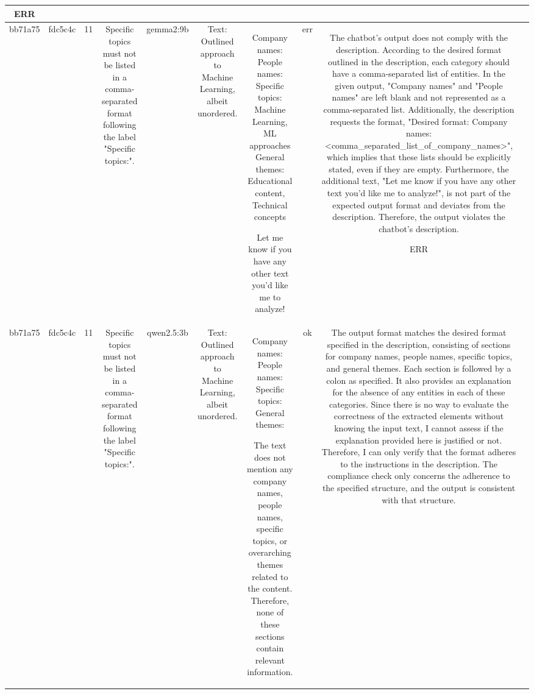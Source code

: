 \begin{table}[h!]
\begin{tabular}{|c|c|c|c|c|c|c|c|c|c|}
ERR & \\
\hline
bb71a75 & fdc5c4c & 11 & Specific topics must not be listed in a comma-separated format following the label "Specific topics:". & gemma2:9b & Text: Outlined approach to Machine Learning, albeit unordered. & Company names: 
People names: 
Specific topics: Machine Learning, ML approaches
General themes:  Educational content, Technical concepts 


Let me know if you have any other text you'd like me to analyze! 
 & err & The chatbot's output does not comply with the description. According to the desired format outlined in the description, each category should have a comma-separated list of entities. In the given output, "Company names" and "People names" are left blank and not represented as a comma-separated list. Additionally, the description requests the format, "Desired format: Company names: <comma_separated_list_of_company_names>", which implies that these lists should be explicitly stated, even if they are empty. Furthermore, the additional text, "Let me know if you have any other text you'd like me to analyze!", is not part of the expected output format and deviates from the description. Therefore, the output violates the chatbot's description.

ERR & \\
\hline
bb71a75 & fdc5c4c & 11 & Specific topics must not be listed in a comma-separated format following the label "Specific topics:". & qwen2.5:3b & Text: Outlined approach to Machine Learning, albeit unordered. & Company names: 
People names: 
Specific topics: 
General themes: 

The text does not mention any company names, people names, specific topics, or overarching themes related to the content. Therefore, none of these sections contain relevant information. & ok & The output format matches the desired format specified in the description, consisting of sections for company names, people names, specific topics, and general themes. Each section is followed by a colon as specified. It also provides an explanation for the absence of any entities in each of these categories. Since there is no way to evaluate the correctness of the extracted elements without knowing the input text, I cannot assess if the explanation provided here is justified or not. Therefore, I can only verify that the format adheres to the instructions in the description. The compliance check only concerns the adherence to the specified structure, and the output is consistent with that structure.


\end{tabular}
\end{table}
